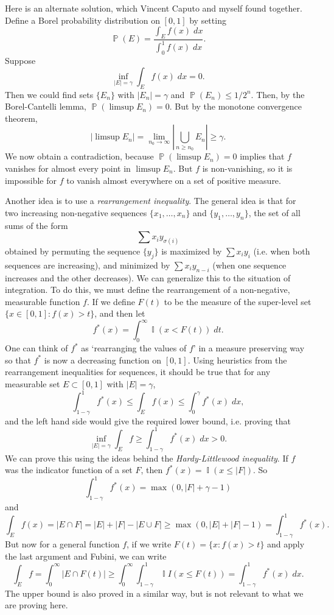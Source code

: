 \documentclass[answers]{exam}
\DeclareMathOperator{\PP}{\mathbb{P}}
\DeclareMathOperator{\II}{\mathbb{I}}
\begin{document}
\begin{questions}
\begin{solution}
	Here is an alternate solution, which Vincent Caputo and myself found together. Define a Borel probability distribution on $[0,1]$ by setting
	\[ \PP(E) = \frac{\int_E f(x)\; dx}{\int_0^1 f(x)\; dx}. \]
	Suppose
	\[ \inf_{|E| = \gamma} \int_E f(x)\; dx = 0. \]
	Then we could find sets $\{ E_n \}$ with $|E_n| = \gamma$ and $\PP(E_n) \leq 1/2^n$. Then, by the Borel-Cantelli lemma, $\PP(\limsup E_n) = 0$. But by the monotone convergence theorem,
	\[ |\limsup E_n| = \lim_{n_0 \to \infty} \left| \bigcup_{n \geq n_0} E_n \right| \geq \gamma. \]
	We now obtain a contradiction, because $\PP(\limsup E_n) = 0$ implies that $f$ vanishes for almost every point in $\limsup E_n$. But $f$ is non-vanishing, so it is impossible for $f$ to vanish almost everywhere on a set of positive measure.

	Another idea is to use a \emph{rearrangement inequality}. The general idea is that for two increasing non-negative sequences $\{ x_1, \dots, x_n \}$ and $\{ y_1,\dots, y_n \}$, the set of all sums of the form
	\[ \sum x_i y_{\sigma(i)} \]
	obtained by permuting the sequence $\{ y_j \}$ is maximized by $\sum x_i y_i$ (i.e. when both sequences are increasing), and minimized by $\sum x_i y_{n-i}$ (when one sequence increases and the other decreases). We can generalize this to the situation of integration. To do this, we must define the rearrangement of a non-negative, measurable function $f$. If we define $F(t)$ to be the measure of the super-level set $\{ x \in [0,1] : f(x) > t \}$, and then let
	\[ f^*(x) = \int_0^\infty \II(x < F(t))\; dt. \]
	One can think of $f^*$ as `rearranging the values of $f$' in a measure preserving way so that $f^*$ is now a decreasing function on $[0,1]$. Using heuristics from the rearrangement inequalities for sequences, it should be true that for any measurable set $E \subset [0,1]$ with $|E| = \gamma$,
	\[ \int_{1 - \gamma}^1 f^*(x) \leq \int_E f(x) \leq \int_0^\gamma f^*(x)\; dx, \]
	and the left hand side would give the required lower bound, i.e. proving that
	\[ \inf_{|E| = \gamma} \int_E f \geq \int_{1 - \gamma}^1 f^*(x)\; dx > 0. \]
	We can prove this using the ideas behind the \emph{Hardy-Littlewood inequality}. If $f$ was the indicator function of a set $F$, then $f^*(x) = \II(x \leq |F|)$. So
	\[ \int_{1 - \gamma}^1 f^*(x) = \max(0,|F| + \gamma - 1) \]
	and
	\[ \int_E f(x) = |E \cap F| = |E| + |F| - |E \cup F| \geq \max(0,|E| + |F| - 1) = \int_{1 - \gamma}^1 f^*(x). \]
	But now for a general function $f$, if we write $F(t) = \{ x : f(x) > t \}$ and apply the last argument and Fubini, we can write
	\[ \int_E f = \int_0^\infty |E \cap F(t)| \geq \int_0^\infty \int_{1 - \gamma}^1 \II{I}(x \leq F(t)) = \int_{1 - \gamma}^1 f^*(x)\; dx. \]
	The upper bound is also proved in a similar way, but is not relevant to what we are proving here.
\end{solution}


\end{questions}
\end{document}
